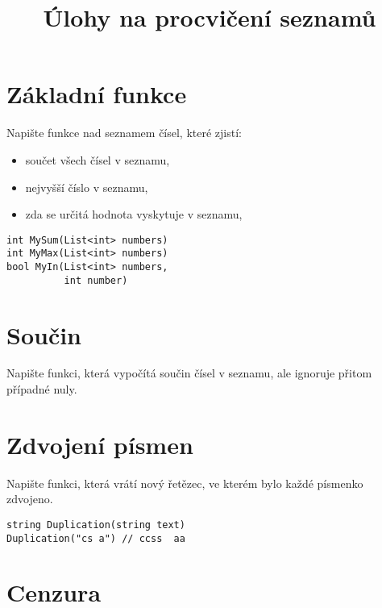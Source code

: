 \documentclass[12pt,a4paper]{article}
\begin{document}
\pagestyle{empty}
\title{Úlohy na procvičení seznamů}
\date{\vspace{-10ex}}
\setlength{\droptitle}{-6em}
\maketitle

\setlength\parindent{0pt}

\begin{multicols}{2}

\section{Základní funkce}

Napište funkce nad seznamem čísel, které zjistí:

\begin{itemize}[noitemsep,nolistsep]
	\item součet všech čísel v seznamu,
	\item nejvyšší číslo v seznamu,
	\item zda se určitá hodnota vyskytuje v seznamu,
\end{itemize}

\begin{verbatim}
int MySum(List<int> numbers)
int MyMax(List<int> numbers)
bool MyIn(List<int> numbers,
          int number)
\end{verbatim}

\section{Součin}

Napište funkci, která vypočítá součin čísel v seznamu, ale ignoruje přitom
případné nuly.

\section{Zdvojení písmen}

Napište funkci, která vrátí nový řetězec, ve kterém bylo každé písmenko
zdvojeno.

\begin{verbatim}
string Duplication(string text)
Duplication("cs a") // ccss  aa
\end{verbatim}

\section{Cenzura}


\end{multicols}
\end{document}
